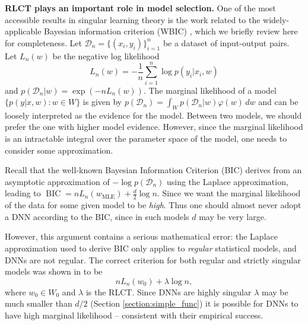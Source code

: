 \documentclass{article} %
\begin{document}
\textbf{RLCT plays an important role in model selection.}
One of the most accessible results in singular learning theory is the work related to the widely-applicable Bayesian information criterion (WBIC) \citet{watanabe_widely_2013}, which we briefly review here for completeness.
Let $\mathcal D_n =  \{(x_i,y_i)\}_{i=1}^n$ be a dataset of input-output pairs.  
Let $L_n(w)$ be the negative log likelihood
\begin{equation}
L_n(w) = -\frac{1}{n} \sum_{i=1}^n \log p(y_i |x_i, w)
\label{eq:nll}
\end{equation}
and $p(\mathcal D_n | w) = \exp( -n L_n(w)).$
The marginal likelihood of a model $\{p(y|x,w): w \in W\}$ is given by
$
p(\mathcal D_n) = \int_W p(\mathcal D_n|w) \varphi(w) \,dw
$
and can be loosely interpreted as the evidence for the model. Between two models, we should prefer the one with higher model evidence. However, since the marginal likelihood is an intractable integral over the parameter space of the model, one needs to consider some approximation.

Recall that the well-known Bayesian Information Criterion (BIC) derives from an asymptotic approximation of $-\log p(\mathcal D_n)$ using the Laplace approximation, leading to
$
\operatorname{BIC} = nL_n( w_{\operatorname{MLE}}) + \frac{d}{2} \log n.
$
Since we want the marginal likelihood of the data for some given model to be \textit{high}. Thus one should almost never adopt a DNN according to the BIC, since in such models $d$ may be very large.

However, this argument contains a serious mathematical error: the Laplace approximation used to derive BIC only applies to \emph{regular} statistical models, and DNNs are not regular. 
The correct criterion for both regular and strictly singular models was shown in \citet{watanabe_widely_2013} to be 
$$
nL_n(w_0) + \lambda \log n,
$$
where $w_0 \in W_0$ and $\lambda$ is the RLCT. 
Since DNNs are highly singular $\lambda$ may be much smaller than $d/2$ (Section \ref{section:simple_func}) it is possible for DNNs to have high marginal likelihood -- consistent with their empirical success. 
\end{document}
